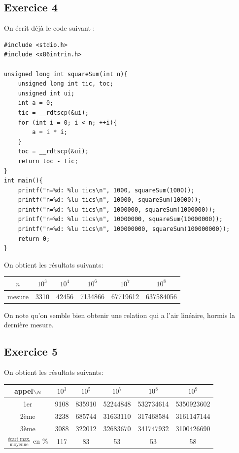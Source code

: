 \documentclass[11pt, a4 paper]{article}
\begin{document}
\subsection{Exercice 4}
On écrit déjà le code suivant :
\begin{lstlisting}[style=CStyle]
#include <stdio.h>
#include <x86intrin.h>

unsigned long int squareSum(int n){
    unsigned long int tic, toc;
    unsigned int ui;
    int a = 0;
    tic = __rdtscp(&ui);
    for (int i = 0; i < n; ++i){
        a = i * i;
    }
    toc = __rdtscp(&ui);
    return toc - tic;
}
int main(){
    printf("n=%d: %lu tics\n", 1000, squareSum(1000));
    printf("n=%d: %lu tics\n", 10000, squareSum(10000));
    printf("n=%d: %lu tics\n", 1000000, squareSum(1000000));
    printf("n=%d: %lu tics\n", 10000000, squareSum(10000000));
    printf("n=%d: %lu tics\n", 100000000, squareSum(100000000));
    return 0;
}
\end{lstlisting}
On obtient les résultats suivants:
\begin{center}
    \begin{tabular}{| c || c | c | c | c | c |}
        \hline
    $n$ & $10^3$ & $10^4$ & $10^6$ & $10^7$ & $10^8$ \\
        \hline
    mesure & 3310 & 42456 & 7134866 & 67719612 & 637584056\\ 
     \hline
    \end{tabular}
\end{center}
On note qu'on semble bien obtenir une relation qui a l'air linéaire, hormis la dernière mesure.

\subsection{Exercice 5}
On obtient les résultats suivants:
\begin{center}
    \begin{tabular}{| c | c | c | c | c | c |}
        \hline
    appel$\backslash n$ & $10^3$ & $10^5$ & $10^7$ & $10^8$ & $10^9$ \\
        \hline
        1er & 9108 & 835910 & 52244848 & 532734614 & 5350923602\\ 
        \hline
        2ème & 3238 & 685744 & 31633110 & 317468584 & 3161147144\\ 
        \hline
        3ème & 3088 & 322012 & 32683670 & 341747932 & 3100426690\\ 
        \hline
    $\frac{\text{écart max.}}{\text{moyenne}}$ en \% & 117 & 83 & 53 & 53 & 58\\ 
     \hline
    \end{tabular}
\end{center}
\end{document}
